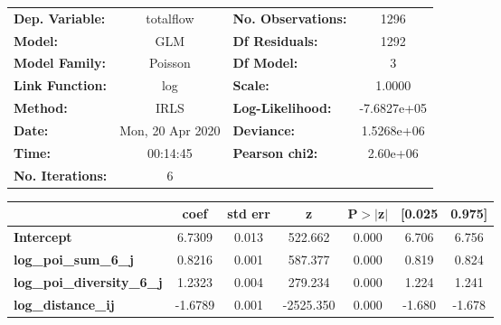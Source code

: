 \begin{center}
\begin{tabular}{lclc}
\toprule
\textbf{Dep. Variable:}            &    totalflow     & \textbf{  No. Observations:  } &      1296    \\
\textbf{Model:}                    &       GLM        & \textbf{  Df Residuals:      } &      1292    \\
\textbf{Model Family:}             &     Poisson      & \textbf{  Df Model:          } &         3    \\
\textbf{Link Function:}            &       log        & \textbf{  Scale:             } &     1.0000   \\
\textbf{Method:}                   &       IRLS       & \textbf{  Log-Likelihood:    } & -7.6827e+05  \\
\textbf{Date:}                     & Mon, 20 Apr 2020 & \textbf{  Deviance:          } &  1.5268e+06  \\
\textbf{Time:}                     &     00:14:45     & \textbf{  Pearson chi2:      } &   2.60e+06   \\
\textbf{No. Iterations:}           &        6         & \textbf{                     } &              \\
\bottomrule
\end{tabular}
\begin{tabular}{lcccccc}
                                   & \textbf{coef} & \textbf{std err} & \textbf{z} & \textbf{P$> |$z$|$} & \textbf{[0.025} & \textbf{0.975]}  \\
\midrule
\textbf{Intercept}                 &       6.7309  &        0.013     &   522.662  &         0.000        &        6.706    &        6.756     \\
\textbf{log\_poi\_sum\_6\_j}       &       0.8216  &        0.001     &   587.377  &         0.000        &        0.819    &        0.824     \\
\textbf{log\_poi\_diversity\_6\_j} &       1.2323  &        0.004     &   279.234  &         0.000        &        1.224    &        1.241     \\
\textbf{log\_distance\_ij}         &      -1.6789  &        0.001     & -2525.350  &         0.000        &       -1.680    &       -1.678     \\
\bottomrule
\end{tabular}
\end{center}